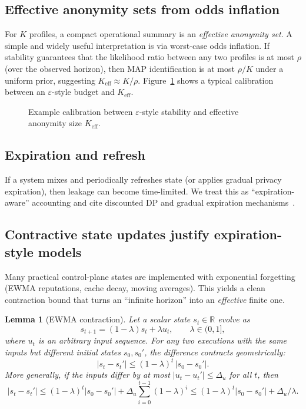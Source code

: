 \documentclass[11pt]{article}
\newtheorem{lemma}{Lemma}
\begin{document}
\subsection{Effective anonymity sets from odds inflation}
For $K$ profiles, a compact operational summary is an \emph{effective anonymity set}.
A simple and widely useful interpretation is via worst-case odds inflation.
If stability guarantees that the likelihood ratio between any two profiles is at most $\rho$ (over the observed horizon), then MAP identification is at most $\rho/K$ under a uniform prior, suggesting
$K_{\mathrm{eff}}\approx K/\rho$.
Figure~\ref{fig:keff-vs-eps} shows a typical calibration between an $\varepsilon$-style budget and $K_{\mathrm{eff}}$.

\begin{figure}[t]
  \centering
  \caption{Example calibration between $\varepsilon$-style stability and effective anonymity size $K_{\mathrm{eff}}$.}
  \label{fig:keff-vs-eps}
\end{figure}

\subsection{Expiration and refresh}
\label{sec:expiration}
If a system mixes and periodically refreshes state (or applies gradual privacy expiration), then leakage can become time-limited.
We treat this as ``expiration-aware'' accounting and cite discounted DP and gradual expiration mechanisms~\cite{Farokhi2020DiscountedDP,AnderssonEtAl2024GradualExpiration}.

\subsection{Contractive state updates justify expiration-style models}
\label{sec:contraction}
Many practical control-plane states are implemented with exponential forgetting (EWMA reputations, cache decay, moving averages).
This yields a clean contraction bound that turns an ``infinite horizon'' into an \emph{effective} finite one.

\begin{lemma}[EWMA contraction]
\label{lem:ewma-contraction}
Let a scalar state $s_t\in\mathbb{R}$ evolve as
\[
s_{t+1}=(1-\lambda)s_t+\lambda u_t,\qquad \lambda\in(0,1],
\]
where $u_t$ is an arbitrary input sequence.
For any two executions with the same inputs but different initial states $s_0,s_0'$, the difference contracts geometrically:
\[
|s_t-s_t'|\le (1-\lambda)^t\,|s_0-s_0'|.
\]
More generally, if the inputs differ by at most $|u_t-u_t'|\le \Delta_u$ for all $t$, then
\[
|s_t-s_t'|\le (1-\lambda)^t|s_0-s_0'|+\Delta_u\sum_{i=0}^{t-1}(1-\lambda)^i\le (1-\lambda)^t|s_0-s_0'|+\Delta_u/\lambda.
\]
\end{lemma}
\end{document}
